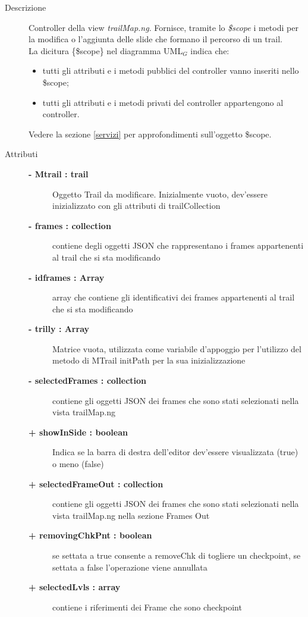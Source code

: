 \begin{description}
\item[Descrizione] \hfill
	Controller della view \textit{trailMap.ng}. Fornisce, tramite lo \textit{\$scope} i metodi per la modifica o l'aggiunta delle slide che formano il percorso di un trail. 
	\\ La dicitura \{\$scope\} nel diagramma UML$_G$ indica che:
\begin{itemize}
\item tutti gli attributi e i metodi pubblici del controller vanno inseriti nello \$scope;
\item tutti gli attributi e i metodi privati del controller appartengono al controller.
\end{itemize}
Vedere la sezione \ref{servizi} per approfondimenti sull'oggetto \$scope.
	
\item[Attributi] \hfill
	\begin{description}
		\item[\textbf{- Mtrail : trail			}] \hfill
			Oggetto Trail da modificare. Inizialmente vuoto, dev’essere inizializzato
con gli attributi di trailCollection
		\item[\textbf{- frames : collection			}] \hfill
			contiene	 degli oggetti JSON che rappresentano i frames appartenenti al trail che si sta modificando
		\item[\textbf{- idframes : Array			}] \hfill			
			array che contiene gli identificativi dei frames appartenenti al trail che si sta modificando		
		\item[\textbf{- trilly : Array			}] \hfill			
			Matrice vuota, utilizzata come variabile d’appoggio per l’utilizzo del metodo
di MTrail initPath per la sua inizializzazione
		\item[\textbf{- selectedFrames : collection			}] \hfill			
			contiene gli oggetti JSON dei frames che sono stati selezionati nella vista trailMap.ng
		\item[\textbf{+ showInSide : boolean			}] \hfill			
			Indica se la barra di destra dell’editor dev’essere visualizzata (true) o meno
(false)
		\item[\textbf{+ selectedFrameOut : collection			}] \hfill			
			contiene gli oggetti JSON dei frames che sono stati selezionati nella vista trailMap.ng nella sezione Frames Out
		\item[\textbf{+ removingChkPnt : boolean			}] \hfill			
			se settata a true consente a removeChk di togliere un checkpoint, se settata a false l'operazione viene annullata	
		\item[\textbf{+ selectedLvls : array			}] \hfill			
			contiene i riferimenti dei Frame che sono checkpoint	
	\end{description}
	

\end{description}
